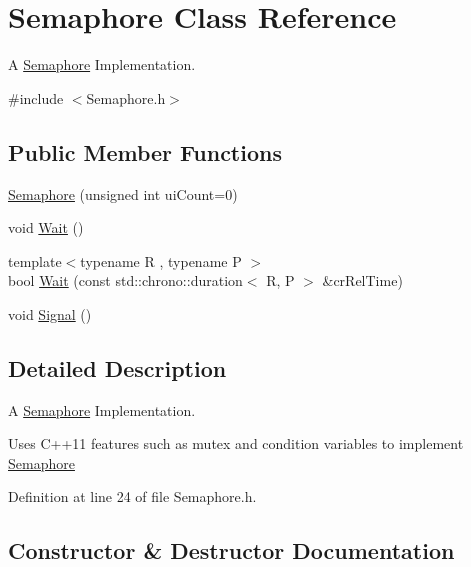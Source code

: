 \hypertarget{class_semaphore}{}\section{Semaphore Class Reference}
\label{class_semaphore}


A \hyperlink{class_semaphore}{Semaphore} Implementation.  




{\ttfamily \#include $<$Semaphore.\+h$>$}

\subsection*{Public Member Functions}
\begin{DoxyCompactItemize}
\item 
\hyperlink{class_semaphore_a0d9290d316636875ca85d1d78950a817}{Semaphore} (unsigned int ui\+Count=0)
\item 
void \hyperlink{class_semaphore_a72aabebf026e3a8b1f3e4d0fa8ee1eda}{Wait} ()
\item 
{\footnotesize template$<$typename R , typename P $>$ }\\bool \hyperlink{class_semaphore_a7f700173ae86ae623684109066e07656}{Wait} (const std\+::chrono\+::duration$<$ R, P $>$ \&cr\+Rel\+Time)
\item 
void \hyperlink{class_semaphore_a86f92f738b4486439b296d8e235895f2}{Signal} ()
\end{DoxyCompactItemize}


\subsection{Detailed Description}
A \hyperlink{class_semaphore}{Semaphore} Implementation. 

Uses C++11 features such as mutex and condition variables to implement \hyperlink{class_semaphore}{Semaphore} 

Definition at line 24 of file Semaphore.\+h.



\subsection{Constructor \& Destructor Documentation}
\mbox{\label{class_semaphore_a0d9290d316636875ca85d1d78950a817}} 
